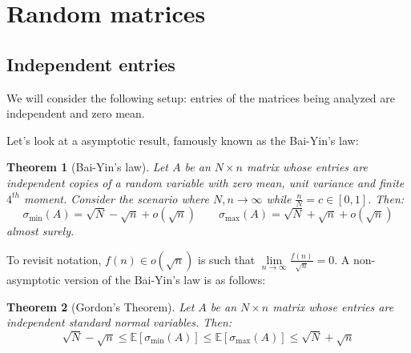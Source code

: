 \documentclass{article}
\newtheorem{theorem}{Theorem}[subsection]
\theoremstyle{remark}
\newcommand{\Exp}{\mathbb{E}}
\begin{document}
\section{Random matrices}
\subsection{Independent entries}
We will consider the following setup: entries of the matrices being analyzed are independent and zero mean.

Let's look at a asymptotic result, famously known as the Bai-Yin's law:
\begin{theorem}[Bai-Yin's law]
Let \(A\) be an \(N \times n\) matrix whose entries are independent copies of a random variable with zero mean, unit variance and finite \(4^{th}\) moment. Consider the scenario where \(N, n \to \infty\) while \(\frac{n}{N} = c \in [0, 1]\). Then:
\begin{equation*}
\sigma_{\min}(A) = \sqrt{N} - \sqrt{n} + o(\sqrt{n}) \qquad \sigma_{\max}(A) = \sqrt{N} + \sqrt{n} + o(\sqrt{n})
\end{equation*}
almost surely.
\end{theorem}

To revisit notation, \(f(n) \in o(\sqrt{n})\) is such that \(\lim\limits_{n\to\infty} \frac{f(n)}{\sqrt{n}} = 0\). A non-asymptotic version of the Bai-Yin's law is as follows:
\begin{theorem}[Gordon's Theorem]
Let \(A\) be an \(N \times n\) matrix whose entries are independent standard normal variables. Then:
\begin{equation*}
\sqrt{N} - \sqrt{n} \leq \Exp[\sigma_{\min}(A)] \leq \Exp[\sigma_{\max}(A)] \leq \sqrt{N} + \sqrt{n}
\end{equation*}
\end{theorem}
\end{document}
